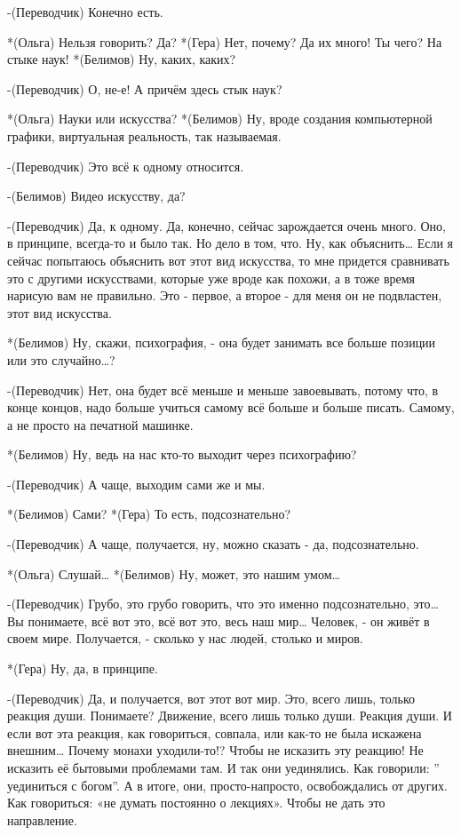 -(Переводчик) Конечно есть.

*(Ольга) Нельзя говорить? Да?
*(Гера) Нет, почему? Да их много! Ты чего? На стыке наук!
*(Белимов) Ну, каких, каких?

-(Переводчик) О, не-е! А причём здесь стык наук?

*(Ольга) Науки или искусства?
*(Белимов) Ну, вроде создания компьютерной графики, виртуальная реальность, так называемая.

-(Переводчик) Это всё к одному относится.

-(Белимов) Видео искусству, да?

-(Переводчик) Да, к одному. Да, конечно, сейчас зарождается очень много. Оно, в принципе, всегда-то  и было так. Но дело в том, что. Ну, как объяснить… Если я сейчас попытаюсь объяснить вот этот вид искусства, то мне придется сравнивать это с другими искусствами, которые уже вроде как похожи, а в тоже время нарисую вам не правильно. Это - первое, а второе - для меня он не подвластен, этот вид искусства. 

*(Белимов) Ну, скажи, психография, - она будет занимать все больше позиции или это случайно…?

-(Переводчик) Нет, она будет всё меньше и меньше завоевывать, потому что, в конце концов, надо больше учиться самому всё больше и больше писать. Самому, а не просто на печатной машинке.

*(Белимов) Ну, ведь на нас кто-то выходит через психографию? 

-(Переводчик) А чаще, выходим сами же и мы.

*(Белимов) Сами?
*(Гера) То есть, подсознательно?

-(Переводчик) А чаще, получается, ну, можно сказать - да, подсознательно.

*(Ольга) Слушай…
*(Белимов) Ну, может,  это нашим умом…

-(Переводчик) Грубо, это грубо говорить, что это именно подсознательно, это… Вы понимаете,  всё вот это, всё вот это, весь наш мир… Человек, - он живёт в своем мире. Получается, - сколько у нас людей, столько и миров. 

*(Гера) Ну, да, в принципе.

-(Переводчик) Да, и получается, вот этот вот мир. Это, всего лишь, только реакция души. Понимаете? Движение, всего лишь только души. Реакция души. И если вот эта реакция, как говориться, совпала, или как-то не была искажена внешним… Почему монахи уходили-то!? Чтобы не исказить эту реакцию! Не исказить её бытовыми проблемами там. И так они уединялись. Как говорили: ” уединиться с богом”.  А в итоге, они, просто-напросто, освобождались от других. Как говориться: «не думать постоянно о лекциях». Чтобы не дать это направление. 

